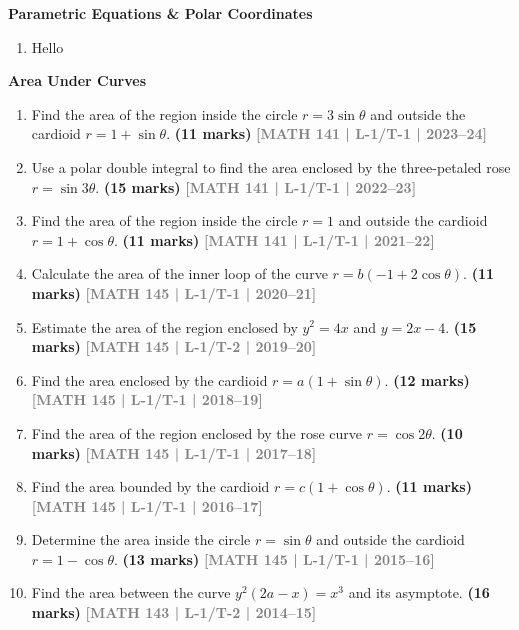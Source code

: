 \documentclass[12pt,a4paper]{article}
\newcommand{\yr}[1]{\hfill\textcolor{gray}{\small\textbf{[#1]}}}
\newcommand{\mk}[1]{\textcolor{orange!70!black}{\small\textbf{(#1 marks)}}}
\newcommand{\subtopic}[2]{%
  \vspace{10pt}
  \noindent\begin{tcolorbox}[colback=#1!8,colframe=#1,boxrule=0.6pt,arc=4pt,
    left=6pt,right=6pt,top=4pt,bottom=4pt]
    \small\bfseries\textcolor{#1}{#2}
  \end{tcolorbox}
  \vspace{2pt}
}
\begin{document}
\subtopic{cB}{Parametric Equations \& Polar Coordinates}
\label{sub:s2-param}

\begin{enumerate}\item Hello \end{enumerate}

\subtopic{cB}{Area Under Curves}
\label{sub:s2-area}

\begin{enumerate}\item Find the area of the region inside the circle $r=3\sin\theta$ and outside the cardioid $r=1+\sin\theta$.
\mk{11} \yr{MATH 141 | L-1/T-1 | 2023--24}

\item Use a polar double integral to find the area enclosed by the three-petaled rose $r=\sin 3\theta$.
\mk{15} \yr{MATH 141 | L-1/T-1 | 2022--23}

\item Find the area of the region inside the circle $r=1$ and outside the cardioid $r=1+\cos\theta$.
\mk{11} \yr{MATH 141 | L-1/T-1 | 2021--22}

\item Calculate the area of the inner loop of the curve $r=b(-1+2\cos\theta)$.
\mk{11} \yr{MATH 145 | L-1/T-1 | 2020--21}

\item Estimate the area of the region enclosed by $y^{2}=4x$ and $y=2x-4$.
\mk{15} \yr{MATH 145 | L-1/T-2 | 2019--20}

\item Find the area enclosed by the cardioid $r=a(1+\sin\theta)$.
\mk{12} \yr{MATH 145 | L-1/T-1 | 2018--19}

\item Find the area of the region enclosed by the rose curve $r=\cos 2\theta$.
\mk{10} \yr{MATH 145 | L-1/T-1 | 2017--18}

\item Find the area bounded by the cardioid $r=c(1+\cos\theta)$.
\mk{11} \yr{MATH 145 | L-1/T-1 | 2016--17}

\item Determine the area inside the circle $r=\sin\theta$ and outside the cardioid $r=1-\cos\theta$.
\mk{13} \yr{MATH 145 | L-1/T-1 | 2015--16}

\item Find the area between the curve $y^{2}(2a-x)=x^{3}$ and its asymptote.
\mk{16\textonehalf} \yr{MATH 143 | L-1/T-2 | 2014--15}


\end{enumerate}
\end{document}
